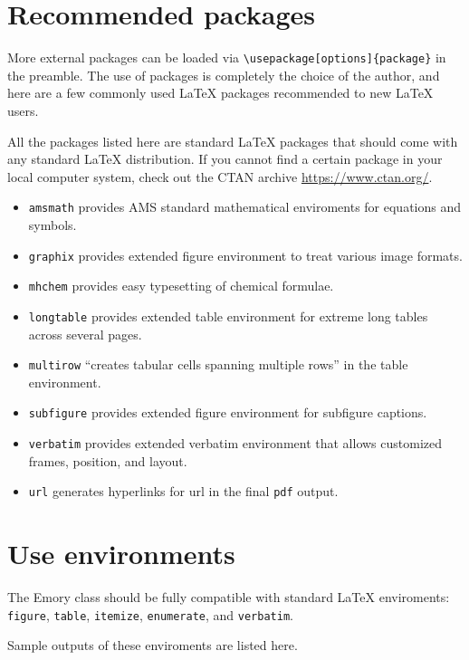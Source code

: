 \documentclass[draft,twoside]{emory}
\begin{document}
\section{Recommended packages}
More external packages can be loaded via \verb|\usepackage[options]{package}|
in the preamble. The use of packages is completely the choice of the author,
and here are a few commonly used \LaTeX{} packages recommended to new \LaTeX{}
users.

All the packages listed here are standard \LaTeX{} packages that should come
with any standard \LaTeX{} distribution. If you cannot find a certain package 
in your local computer system, check out the CTAN archive \url{https://www.ctan.org/}.

\begin{itemize}
\item \verb|amsmath| provides AMS standard mathematical enviroments for equations and symbols.
\item \verb|graphix| provides extended figure environment to treat various image formats.
\item \verb|mhchem| provides easy typesetting of chemical formulae.
\item \verb|longtable| provides extended table environment for extreme long tables
across several pages.
\item \verb|multirow| ``creates tabular cells spanning multiple rows'' in the table environment.
\item \verb|subfigure| provides extended figure environment for subfigure captions. 
\item \verb|verbatim| provides extended verbatim environment that allows customized 
frames, position, and layout.
\item \verb|url| generates hyperlinks for url in the final \verb|pdf| output.
\end{itemize}


\section{Use environments}\label{sec:env}
The Emory class should be fully compatible with standard \LaTeX{} enviroments:
\verb|figure|, \verb|table|, \verb|itemize|, \verb|enumerate|, and \verb|verbatim|.

Sample outputs of these enviroments are listed here. 
\end{document}
